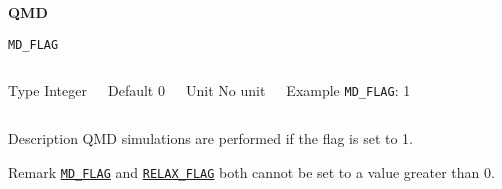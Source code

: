 \begin{frame}[allowframebreaks,c]{} \label{MD}

\begin{center}
\Huge \textbf{QMD}
\end{center}

\end{frame}





\begin{frame}[allowframebreaks]{\texttt{MD\_FLAG}} \label{MD_FLAG}
\vspace*{-12pt}
\begin{columns}
\begin{block}{Type}
Integer
\end{block}

\begin{block}{Default}
0
\end{block}

\begin{block}{Unit}
No unit
\end{block}

\begin{block}{Example}
\texttt{MD\_FLAG}: 1
\end{block}
\end{columns}

\begin{block}{Description}
QMD simulations are performed if the flag is set to 1.
\end{block}

\begin{block}{Remark}
\hyperlink{MD_FLAG}{\texttt{MD\_FLAG}} and \hyperlink{RELAX_FLAG}{\texttt{RELAX\_FLAG}} both cannot be set to a value greater than 0. 
\end{block}

\end{frame}



